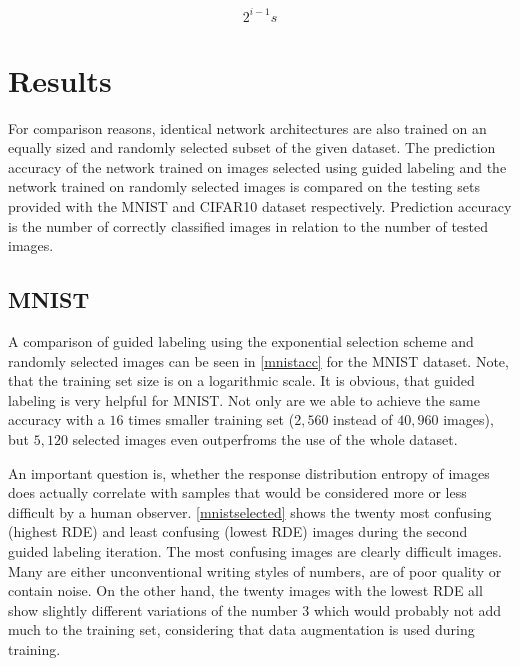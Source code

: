 \documentclass[10pt,twocolumn,letterpaper]{article}
\begin{document}
\begin{equation}
  \label{eq:3}
  2^{i-1}s
\end{equation}

\section{Results}
\label{sec-4}
For comparison reasons, identical network architectures are also
trained on an equally sized and randomly selected subset of the given
dataset. The prediction accuracy of the network trained on images
selected using guided labeling and the network trained on randomly
selected images is compared on the testing sets provided with the
MNIST and CIFAR10 dataset respectively. Prediction accuracy is the
number of correctly classified images in relation to the number of
tested images.
\subsection{MNIST}
\label{sec-4-1}
A comparison of guided labeling using the exponential selection scheme
and randomly selected images can be seen in \autoref{mnistacc} for the
MNIST dataset. Note, that the training set size is on a logarithmic
scale. It is obvious, that guided labeling is very helpful for MNIST.
Not only are we able to achieve the same accuracy with a $16$ times
smaller training set ($2,560$ instead of $40,960$ images), but $5,120$
selected images even outperfroms the use of the whole dataset.

An important question is, whether the response distribution entropy of
images does actually correlate with samples that would be considered
more or less difficult by a human observer. \autoref{mnistselected}
shows the twenty most confusing (highest RDE) and least confusing
(lowest RDE) images during the second guided labeling iteration. The
most confusing images are clearly difficult images. Many are either
unconventional writing styles of numbers, are of poor quality or
contain noise. On the other hand, the twenty images with the lowest
RDE all show slightly different variations of the number 3 which would
probably not add much to the training set, considering that data
augmentation is used during training.
\end{document}

